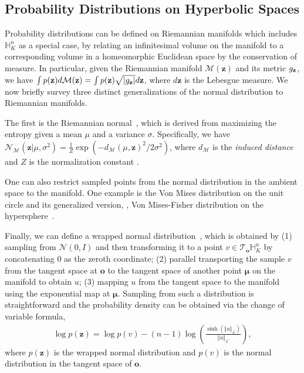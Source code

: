 \subsection{Probability Distributions on Hyperbolic Spaces}\label{sec:hyperprobs}

Probability distributions can be defined on Riemannian manifolds which includes $\mathbb{H}^n_K$ as a special case, by relating an infinitesimal volume on the manifold to a corresponding volume in a homeomorphic Euclidean space by the conservation of measure.
In particular, given the Riemannian manifold $\mathcal{M}(\textbf{z})$ and its metric $g_{\mathbf{z}}$, we have $\int p(\textbf{z}) d\mathcal{M} (\textbf{z}) = \int p(\textbf{z})\sqrt{|g_{\mathbf{z}}|}d \textbf{z}$, where $d \textbf{z}$ is the Lebesgue measure. We now briefly survey three distinct generalizations of the normal distribution to Riemannian manifolds.

The first is the Riemannian normal~\cite{pennec2006intrinsic, said2014new}, which is derived from maximizing the entropy given a mean $\mu$ and a variance $\sigma$.
Specifically, we have $\mathcal{N}_{\mathcal{M}}(\textbf{z} \vert \mu, \sigma^{2}) = \frac{1}{Z} \exp \left( - d_{\mathcal{M}}(\mu, \textbf{z})^2 / 2 \sigma^{2} \right)$, where $d_{\mathcal{M}}$ is the \textit{induced distance} and $Z$ is the normalization constant \cite{said2014new, mathieu2019continuous}.

One can also restrict sampled points from the normal distribution in the ambient space to the manifold.
One example is the Von Mises distribution on the unit circle and its generalized version, \ie, Von Mises-Fisher distribution on the hypersphere~\cite{davidson2018hyperspherical}.

Finally, we can define a wrapped normal distribution~\cite{falorsi2019reparameterizing,nagano2019wrapped}, which is obtained by (1) sampling from $\mathcal{N}(0,I)$ and then transforming it to a point $v \in \mathcal{T}_\textbf{o}\mathbb{H}_K^n$ by concatenating $0$ as the zeroth coordinate; (2) parallel transporting the sample $v$ from the tangent space at $\textbf{o}$ to the tangent space of another point $\boldsymbol{\mu} $ on the manifold to obtain $u$; (3) mapping $u$ from the tangent space to the manifold using the exponential map at $\boldsymbol{\mu}$.
Sampling from such a distribution is straightforward and the probability density can be obtained via the change of variable formula,
\begin{align}
    \log p(\textbf{z}) = \log p(v) - (n-1) \log \left(\frac{\sinh{ ( \Vert u \Vert_{\mathcal{L}} ) }}{ \Vert u \Vert_{\mathcal{L}} } \right),
\end{align}
where $p(\textbf{z})$ is the wrapped normal distribution and $p(v)$ is the normal distribution in the tangent space of $\textbf{o}$.




